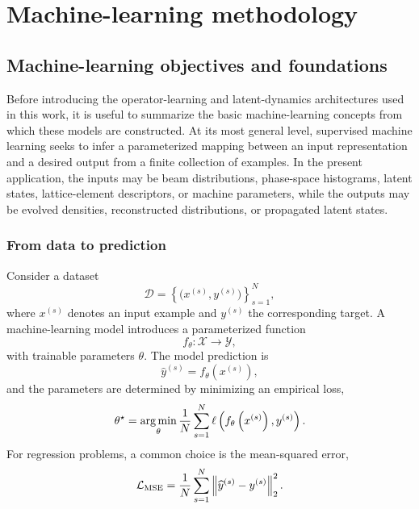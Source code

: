
\section{Machine-learning methodology}
\label{sec:methodology}
\subsection{Machine-learning objectives and foundations}
\label{subsec:ml_foundations}

Before introducing the operator-learning and latent-dynamics architectures used in this work, it is useful to summarize the basic machine-learning concepts from which these models are constructed. At its most general level, supervised machine learning seeks to infer a parameterized mapping between an input representation and a desired output from a finite collection of examples. In the present application, the inputs may be beam distributions, phase-space histograms, latent states, lattice-element descriptors, or machine parameters, while the outputs may be evolved densities, reconstructed distributions, or propagated latent states.

\subsubsection{From data to prediction}
\label{subsubsec:data_to_prediction}

Consider a dataset
\begin{equation}
    \mathcal{D}
    =
    \left\{
    \bigl(
    x^{(s)},
    y^{(s)}
    \bigr)
    \right\}_{s=1}^{N},
\end{equation}
where $x^{(s)}$ denotes an input example and $y^{(s)}$ the corresponding target. A machine-learning model introduces a parameterized function
\begin{equation}
    f_{\theta}
    :
    \mathcal{X}
    \longrightarrow
    \mathcal{Y},
\end{equation}
with trainable parameters $\theta$. The model prediction is
\begin{equation}
    \widehat{y}^{(s)}
    =
    f_{\theta}
    \left(
    x^{(s)}
    \right),
\end{equation}
and the parameters are determined by minimizing an empirical loss,
\begin{equation}
    \theta^{\star}
    =
    \operatorname*{arg\,min}_{\theta}
    \frac{1}{N}
    \sum_{s=1}^{N}
    \ell
    \left(
    f_{\theta}
    \left(
    x^{(s)}
    \right),
    y^{(s)}
    \right).
    \label{eq:basic_ml_training}
\end{equation}
For regression problems, a common choice is the mean-squared error,
\begin{equation}
    \mathcal{L}_{\mathrm{MSE}}
    =
    \frac{1}{N}
    \sum_{s=1}^{N}
    \left\lVert
    \widehat{y}^{(s)}
    -
    y^{(s)}
    \right\rVert_{2}^{2}.
\end{equation}

